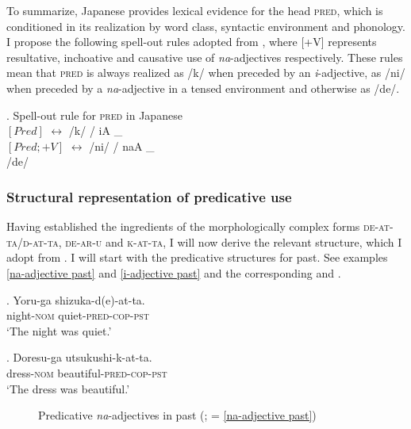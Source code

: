 To summarize, Japanese provides lexical evidence for the head \textsc{pred}, which is conditioned in its realization by word class, syntactic environment and phonology. I propose the following spell-out rules adopted from \citet[207]{nishiyama:1999:adj}, where [+V] represents resultative, inchoative and causative use of \textit{na}-adjectives respectively. These rules mean that \textsc{pred} is always realized as /k/ when preceded by an \textit{i}-adjective, as /ni/ when preceded by a \textit{na}-adjective in a tensed environment and otherwise as /de/.

\ex. Spell-out rule for \textsc{pred} in Japanese\\
$[Pred]$\phantom{; +V} $\leftrightarrow$ /k/ / iA \_ \\
$[Pred; +V]$ $\leftrightarrow$ /ni/ / naA \_ \\
\phantom{$[Pred; +V]$ $\leftrightarrow$} /de/

\subsubsection{Structural representation of predicative use}

Having established the ingredients of the morphologically complex forms \textsc{de-at-ta}/\textsc{d-at-ta}, \textsc{de-ar-u} and \textsc{k-at-ta}, I will now derive the relevant structure, which I adopt from \citet[189–194]{nishiyama:1999:adj}. I will start with the predicative structures for past. See examples \ref{na-adjective past} and \ref{i-adjective past} and the corresponding  and .

\exg. Yoru-ga shizuka-d(e)-at-ta.\\
night-\textsc{nom} quiet-\textsc{pred-cop-pst}\\
`The night was quiet.' \label{na-adjective past}

\exg. Doresu-ga utsukushi-k-at-ta.\\
dress-\textsc{nom} beautiful-\textsc{pred-cop-pst}\\
`The dress was beautiful.' \label{i-adjective past}

\begin{figure}
\centering
{}
\caption{Predicative \textit{na}-adjectives in past (\citealt[189, 194]{nishiyama:1999:adj}; = \ref{na-adjective past})}
\label{na-adjective past tree}
\end{figure}

